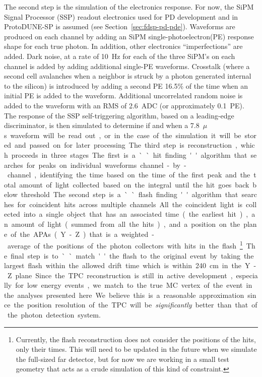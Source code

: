 The second step is the simulation of the electronics response. For now, the SiPM Signal Processor (SSP) readout electronics used for PD development and in ProtoDUNE-SP is assumed (see Section~\ref{sec:fdsp-pd-pde}). 
Waveforms are produced on each channel by adding an SiPM single-photoelectron(PE) response shape for each true photon. In addition, other electronics ``imperfections'' are added. Dark noise, at a rate of \SI{10}{Hz} for each of the three SiPM's on each channel is added by adding additional single-PE waveforms. Crosstalk (where a second cell avalanches when a neighbor is struck by a photon generated internal to the silicon) is introduced by adding a second PE \num{16.5}\% of the time when an initial PE is added to the waveform. Additional uncorrelated random noise is added to the waveform with an RMS of \SI{2.6}{ADC} (or approximately \SI{0.1}{PE}). The response of the SSP self-triggering algorithm, based on a leading-edge discriminator, is then simulated to determine if and when a \SI{7.8}{$\mu$s} waveform will be read out, or in the case of the simulation it will be stored and passed on for later processing.

The third step is reconstruction, which proceeds in three stages. The first is a ``hit finding'' algorithm that searches for peaks on individual waveforms channel-by-channel, identifying the time based on the time of the first peak and the total amount of light collected based on the integral until the hit goes back below threshold. The second step is a ``flash finding'' algorithm that searches for coincident hits across multiple channels. All the coincident light is collected into a single object that has an associated time (the earliest hit), an amount of light (summed from all the hits), and a position on the plane of the APAs (Y-Z) that is a weighted-average of the positions of the photon collectors with hits in the flash\footnote{Currently, the flash reconstruction does not consider the positions of the hits, only their times. 
This will need to be updated in the future when we simulate the full-sized far detector, but for now we are working in a small test geometry that acts as a crude simulation of this kind of constraint.}. The final step is to ``match'' the flash to the original event by taking the largest flash within the allowed drift time which is within \SI{240}{cm} in the Y-Z plane. Since the TPC reconstruction is still in active development, especially for low energy events, we match to the true MC vertex of the event in the analyses presented here. We believe this is a reasonable approximation since the position resolution of the TPC will be \emph{significantly} better than that of the photon detection system. 

